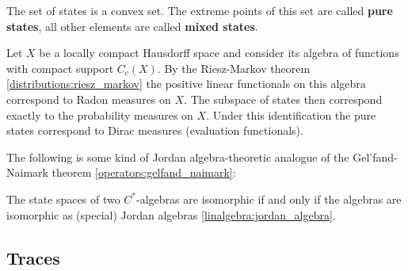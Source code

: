     \begin{property}[Convexity]
        The set of states is a convex set. The extreme points of this set are called \textbf{pure states}, all other elements are called \textbf{mixed states}.
    \end{property}

    \begin{example}
        Let $X$ be a locally compact Hausdorff space and consider its algebra of functions with compact support $C_c(X)$. By the Riesz-Markov theorem \ref{distributions:riesz_markov} the positive linear functionals on this algebra correspond to Radon measures on $X$. The subspace of states then correspond exactly to the probability measures on $X$. Under this identification the pure states correspond to Dirac measures (evaluation functionals).
    \end{example}

    The following is some kind of Jordan algebra-theoretic analogue of the Gel'fand-Naimark theorem \ref{operators:gelfand_naimark}:
    \begin{theorem}
        The state spaces of two $C^*$-algebras are isomorphic if and only if the algebras are isomorphic as (special) Jordan algebras \ref{linalgebra:jordan_algebra}.
    \end{theorem}

\subsection{Traces}


